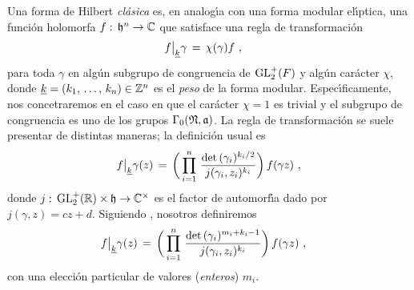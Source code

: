 Una forma de Hilbert \emph{cl\'{a}sica} es, en analog\'{\i}a con una forma
modular el\'{\i}ptica, una funci\'{o}n holomorfa $f:\,\hP^{n}\rightarrow\bb{C}$
que satisface una regla de transformaci\'{o}n
\begin{align*}
	f\operadormatrices{\peso{k}}{\gamma} & \,=\, \chi(\gamma)f
	\text{ ,}
\end{align*}
%
para toda $\gamma$ en alg\'{u}n subgrupo de congruencia de $\GLtp_{2}(F)$
y alg\'{u}n car\'{a}cter $\chi$, donde $\peso{k}=(\lista{k}{n})\in\bb{Z}^{n}$
es el \emph{peso} de la forma modular. Espec\'{\i}ficamente, nos concetraremos
en el caso en que el car\'{a}cter $\chi=1$ es trivial y el subgrupo de
congruencia es uno de los grupos $\Gamma_{0}(\frak{N},\frak{a})$. La regla de
transformaci\'{o}n se suele presentar de distintas maneras; la definici\'{o}n
usual es
\begin{equation}
	\label{eq:operadormatricesusual}
	f\operadormatrices{\peso{k}}{\gamma} (z) \,=\,
		\bigg(\prod_{i=1}^{n}\,\frac{\det(\gamma_{i})^{k_{i}/2}}{%
			j(\gamma_{i},z_{i})^{k_{i}}}\bigg)\,f(\gamma z)
	\text{ ,}
\end{equation}
%
donde $j:\,\GLtp_{2}(\bb{R})\times\hP\rightarrow\bb{C}^{\times}$ es el factor
de automorf\'{\i}a dado por $j(\gamma,z)=cz+d$. Siguiendo \cite{DembeleVoight},
nosotros definiremos
\begin{align*}
	f\operadormatrices{\peso{k}}{\gamma} (z) & \,=\,
		\bigg(\prod_{i=1}^{n}\,
		\frac{\det(\gamma_{i})^{m_{i}+k_{i}-1}}{%
			j(\gamma_{i},z_{i})^{k_{i}}}\bigg)\,f(\gamma z)
	\text{ ,}
\end{align*}
%
con una elecci\'{o}n particular de valores (\emph{enteros}) $m_{i}$.

